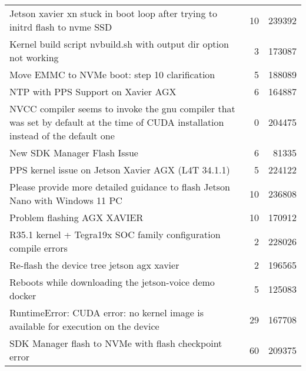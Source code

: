 \begin{longtable}{p{}rr}
    Jetson xavier xn stuck in boot loop after trying to initrd flash to nvme SSD                                                       & 10      & 239392 \\
    Kernel build script nvbuild.sh with output dir option not working                                                                  & 3       & 173087 \\
    Move EMMC to NVMe boot: step 10 clarification                                                                                      & 5       & 188089 \\
    NTP with PPS Support on Xavier AGX                                                                                                 & 6       & 164887 \\
    NVCC compiler seems to invoke the gnu compiler that was set by default at the time of CUDA installation instead of the default one & 0       & 204475 \\
    New SDK Manager Flash Issue                                                                                                        & 6       & 81335  \\
    PPS kernel issue on Jetson Xavier AGX (L4T 34.1.1)                                                                                 & 5       & 224122 \\
    Please provide more detailed guidance to flash Jetson Nano with Windows 11 PC                                                      & 10      & 236808 \\
    Problem flashing AGX XAVIER                                                                                                        & 10      & 170912 \\
    R35.1 kernel + Tegra19x SOC family configuration compile errors                                                                    & 2       & 228026 \\
    Re-flash the device tree jetson agx xavier                                                                                         & 2       & 196565 \\
    Reboots while downloading the jetson-voice demo docker                                                                             & 5       & 125083 \\
    RuntimeError: CUDA error: no kernel image is available for execution on the device                                                 & 29      & 167708 \\
    SDK Manager flash to NVMe with flash checkpoint error                                                                              & 60      & 209375 \\

\end{longtable}
